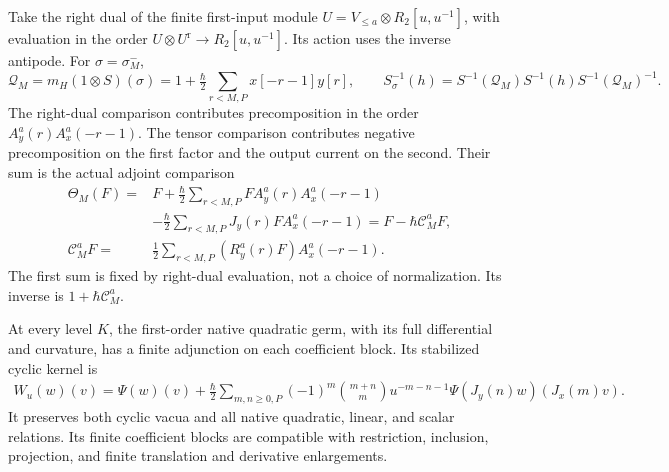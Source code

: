 Take the right dual of the finite first-input module
$U=V_{\leq a}\otimes R_2[u,u^{-1}]$, with evaluation in the order
$U\otimes U^{\mathrm r}\to R_2[u,u^{-1}]$.
Its action uses the inverse antipode.  For $\sigma=\sigma_M^-$,
\[
 \mathcal Q_M=m_H(1\otimes S)(\sigma)
      =1+\tfrac\hbar2\sum_{r<M,P}x[-r-1]y[r],
 \qquad S_\sigma^{-1}(h)
   =S^{-1}(\mathcal Q_M)S^{-1}(h)S^{-1}(\mathcal Q_M)^{-1}.
\]
The right-dual comparison contributes precomposition in the order
$A_y^a(r)A_x^a(-r-1)$.  The tensor comparison contributes negative
precomposition on the first factor and the output current on the
second.  Their sum is the actual adjoint comparison
\begin{equation}\label{cyquant:eq:finite-right-dual}
 \begin{aligned}
 \Theta_M(F)={}&F+\tfrac\hbar2\sum_{r<M,P}
                    FA_y^a(r)A_x^a(-r-1)\\
 &-\tfrac\hbar2\sum_{r<M,P}J_y(r)FA_x^a(-r-1)
       =F-\hbar\mathcal C_M^aF,\\
 \mathcal C_M^aF={}&\tfrac12\sum_{r<M,P}(R_y^a(r)F)A_x^a(-r-1).
 \end{aligned}
\end{equation}
The first sum is fixed by right-dual evaluation, not a choice of
normalization.  Its inverse is $1+\hbar\mathcal C_M^a$.

\begin{theorem}\label{cyquant:thm:finite-adjunction}
At every level $K$, the first-order native quadratic germ, with its
full differential and curvature, has a finite adjunction on each
coefficient block.  Its stabilized cyclic kernel is
\begin{equation}\label{cyquant:eq:quantum-kernel}
 \begin{aligned}
 W_u(w)(v)=\Psi(w)(v)+\frac\hbar2
 \sum_{m,n\geq0,P}(-1)^m\binom{m+n}{m}u^{-m-n-1}
          \Psi(J_y(n)w)(J_x(m)v).
 \end{aligned}
\end{equation}
It preserves both cyclic vacua and all native quadratic, linear, and
scalar relations.  Its finite coefficient blocks are compatible with
restriction, inclusion, projection, and finite translation and derivative
enlargements.
\end{theorem}

